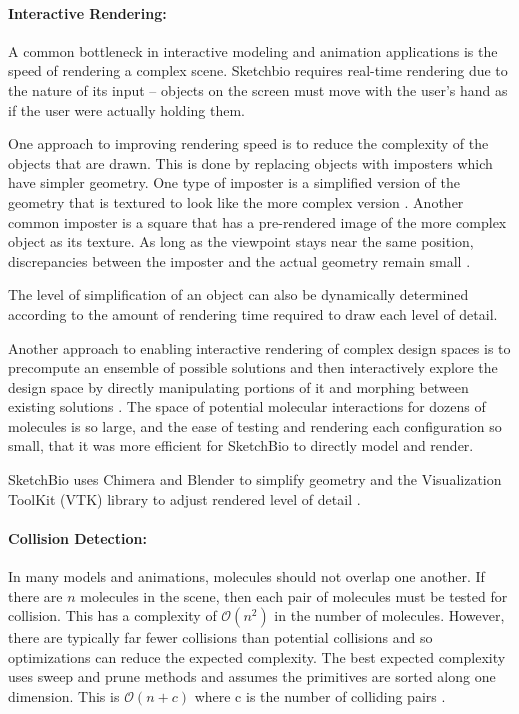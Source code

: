 \documentclass[twocolumn]{bmcart}%
\begin{document}
\paragraph*{Interactive Rendering:}
A common bottleneck in interactive modeling and animation applications is the speed of rendering a complex scene.
Sketchbio requires real-time rendering due to the nature of its input -- objects on the screen must move with the user's hand as if the user were actually holding them. 

One approach to improving rendering speed is to reduce the complexity of the objects that are drawn.
This is done by replacing objects with imposters which have simpler geometry.
One type of imposter is a simplified version of the geometry that is textured to look like the more complex version \cite{decoret2003billboard,erikson1998simplification,cohen1998appearance}.
Another common imposter is a square that has a pre-rendered image of the more complex object as its texture.  As long as the viewpoint stays near the same position, discrepancies between the imposter and the actual geometry remain small \cite{aliaga1996visualization,maciel1995visual}.

The level of simplification of an object can also be dynamically determined according to the amount of rendering time required to draw each level of detail.

Another approach to enabling interactive rendering of complex design spaces is to precompute an ensemble of possible solutions and then interactively explore the design space by directly manipulating portions of it and morphing between existing solutions \cite{Coffey2013}. The space of potential molecular interactions for dozens of molecules is so large, and the ease of testing and rendering each configuration so small, that it was more efficient for SketchBio to directly model and render.

SketchBio uses Chimera and Blender to simplify geometry and the Visualization ToolKit (VTK) library to adjust rendered level of detail \cite{VTKbook}.

\paragraph*{Collision Detection:}
In many models and animations, molecules should not overlap one another.
If there are $n$ molecules in the scene, then each pair of molecules must be tested for collision.
This has a complexity of $\mathcal{O}(n^2)$ in the number of molecules.
However, there are typically far fewer collisions than potential collisions and so optimizations can reduce the expected complexity.
The best expected complexity uses sweep and prune methods and assumes the primitives are sorted along one dimension. This is $\mathcal{O}(n + c)$ where c is the number of colliding pairs \cite{tracy2009efficient}.
\end{document}

